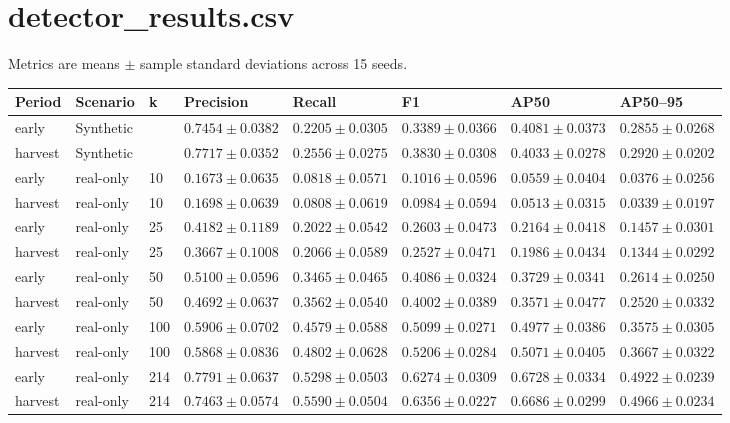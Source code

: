 \documentclass{article}
\begin{document}
\small
\section*{detector\_results.csv}
Metrics are means $\pm$ sample standard deviations across 15 seeds.\par\medskip
\begin{lrbox}{\resulttable}\begin{tabular}{llllllll}
\toprule
Period & Scenario & k & Precision & Recall & F1 & AP50 & AP50--95 \\
\midrule
early & Synthetic &  & $0.7454 \pm 0.0382$ & $0.2205 \pm 0.0305$ & $0.3389 \pm 0.0366$ & $0.4081 \pm 0.0373$ & $0.2855 \pm 0.0268$ \\
harvest & Synthetic &  & $0.7717 \pm 0.0352$ & $0.2556 \pm 0.0275$ & $0.3830 \pm 0.0308$ & $0.4033 \pm 0.0278$ & $0.2920 \pm 0.0202$ \\
early & real-only & 10 & $0.1673 \pm 0.0635$ & $0.0818 \pm 0.0571$ & $0.1016 \pm 0.0596$ & $0.0559 \pm 0.0404$ & $0.0376 \pm 0.0256$ \\
harvest & real-only & 10 & $0.1698 \pm 0.0639$ & $0.0808 \pm 0.0619$ & $0.0984 \pm 0.0594$ & $0.0513 \pm 0.0315$ & $0.0339 \pm 0.0197$ \\
early & real-only & 25 & $0.4182 \pm 0.1189$ & $0.2022 \pm 0.0542$ & $0.2603 \pm 0.0473$ & $0.2164 \pm 0.0418$ & $0.1457 \pm 0.0301$ \\
harvest & real-only & 25 & $0.3667 \pm 0.1008$ & $0.2066 \pm 0.0589$ & $0.2527 \pm 0.0471$ & $0.1986 \pm 0.0434$ & $0.1344 \pm 0.0292$ \\
early & real-only & 50 & $0.5100 \pm 0.0596$ & $0.3465 \pm 0.0465$ & $0.4086 \pm 0.0324$ & $0.3729 \pm 0.0341$ & $0.2614 \pm 0.0250$ \\
harvest & real-only & 50 & $0.4692 \pm 0.0637$ & $0.3562 \pm 0.0540$ & $0.4002 \pm 0.0389$ & $0.3571 \pm 0.0477$ & $0.2520 \pm 0.0332$ \\
early & real-only & 100 & $0.5906 \pm 0.0702$ & $0.4579 \pm 0.0588$ & $0.5099 \pm 0.0271$ & $0.4977 \pm 0.0386$ & $0.3575 \pm 0.0305$ \\
harvest & real-only & 100 & $0.5868 \pm 0.0836$ & $0.4802 \pm 0.0628$ & $0.5206 \pm 0.0284$ & $0.5071 \pm 0.0405$ & $0.3667 \pm 0.0322$ \\
early & real-only & 214 & $0.7791 \pm 0.0637$ & $0.5298 \pm 0.0503$ & $0.6274 \pm 0.0309$ & $0.6728 \pm 0.0334$ & $0.4922 \pm 0.0239$ \\
harvest & real-only & 214 & $0.7463 \pm 0.0574$ & $0.5590 \pm 0.0504$ & $0.6356 \pm 0.0227$ & $0.6686 \pm 0.0299$ & $0.4966 \pm 0.0234$ \\

\end{tabular}
\end{lrbox}
\end{document}
